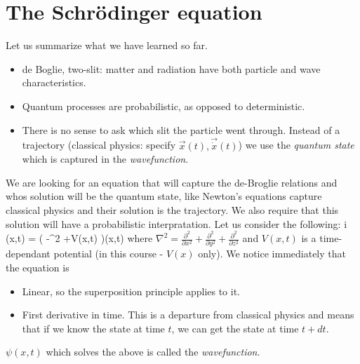 \documentclass{Textbook}
\begin{document}
\section{The Schr{\"o}dinger equation}
Let us summarize what we have learned so far.
\begin{itemize}
	\item de Boglie, two-slit: matter and radiation have both particle and wave characteristics.
	\item Quantum processes are probabilistic, as opposed to deterministic.
	\item There is no sense to ask which slit the particle went through. Instead of a trajectory (classical physics: specify $\vec{x}(t),\vec{\dot{x}}(t)$) we use the \emph{quantum state} which is captured in the \emph{wavefunction}.
\end{itemize}
We are looking for an equation that will capture the de-Broglie relations and whos solution will be the quantum state, like Newton's equations capture classical physics and their solution is the trajectory. We also require that this solution will have a probabilistic interpratation.
Let us consider the following:
\be
i\hbar {} \psi(x,t) = \left( -\nabla^2 +V(x,t) \right)\psi(x,t) 
\label{eq:schred}
\ee
where $\nabla^2 = \frac{\partial^2}{\partial x^2} + \frac{\partial^2}{\partial y^2} + \frac{\partial^2}{\partial z^2}$ and $V(x,t)$ is a time-dependant potential (in this course - $V(x)$ only).\nl
We notice immediately that the equation is
\begin{itemize}
\item Linear, so the superposition principle applies to it.
\item First derivative in time. This is a departure from classical physics and means that if we know the state at time $t$, we can get the state at time $t+dt$.
\end{itemize}
$\psi(x,t)$ which solves the above is called the \emph{wavefunction}.
\end{document}
